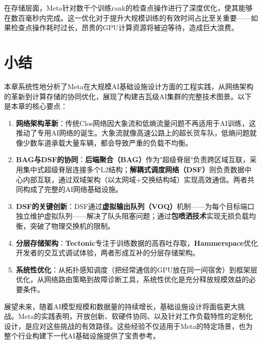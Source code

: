 在存储层面，Meta针对数千个训练rank的检查点操作进行了深度优化，使其能够在数百毫秒内完成。这一优化对于提升大规模训练的有效时间占比至关重要——如果检查点操作耗时过长，昂贵的GPU计算资源将被迫等待，造成巨大浪费。

\section{小结}

本章系统性地分析了Meta在大规模AI基础设施设计方面的工程实践，从网络架构的革新到计算存储的协同优化，展现了构建吉瓦级AI集群的完整技术图景。以下是本章的核心要点：

\begin{enumerate}
    \item \textbf{网络架构革新}：传统Clos网络因大象流和低熵流量问题不再适用于AI训练，这推动了专用AI网络的诞生。大象流就像高速公路上的超长货车队，低熵问题就像少数车道承载大量车辆，都会导致严重的负载不均衡。
    
    \item \textbf{BAG与DSF的协同}：\textbf{后端聚合（BAG）}作为"超级脊层"负责跨区域互联，采用集中式超级脊层连接多个L2结构；\textbf{解耦式调度网络（DSF）}则负责数据中心内部互联，通过双域架构（以太网域+交换结构域）实现高效通信。两者共同构成了完整的AI网络基础设施。
    
    \item \textbf{DSF的关键创新}：DSF通过\textbf{虚拟输出队列（VOQ）}机制——为每个目标端口独立维护虚拟队列——解决了队头阻塞问题；通过\textbf{包喷洒技术}实现无损负载均衡，突破了物理交换机的限制。
    
    \item \textbf{分层存储架构}：\textbf{Tectonic}专注于训练数据的高吞吐存取，\textbf{Hammerspace}优化开发者的交互式调试体验，两者形成互补的分层存储架构。
    
    \item \textbf{系统性优化}：从拓扑感知调度（把经常通信的GPU放在同一间宿舍）到框架层优化，从网络路由策略到故障诊断工具，系统性优化是充分释放规模效益的必要条件。
\end{enumerate}

展望未来，随着AI模型规模和数据量的持续增长，基础设施设计将面临更大挑战。Meta的实践表明，开放创新、软硬件协同、以及针对工作负载特性的定制化设计，是应对这些挑战的有效路径。这些经验不仅适用于Meta的特定场景，也为整个行业构建下一代AI基础设施提供了宝贵参考。

